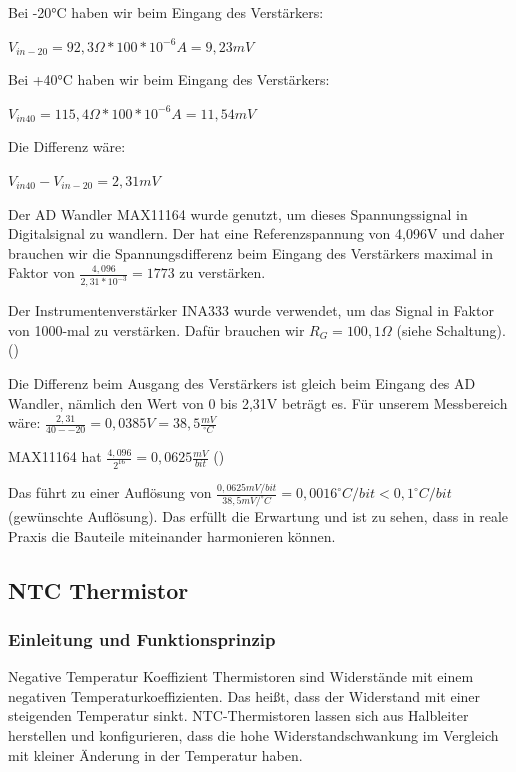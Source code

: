 \documentclass[12pt]{article}
\begin{document}
Bei -20°C haben wir beim Eingang des Verstärkers: 

\begin{center}
  $V_{in-20} = 92,3\Omega * 100 * 10^{-6}A = 9,23mV$ 
\end{center}

Bei +40°C haben wir beim Eingang des Verstärkers: 

\begin{center}
  $V_{in40} = 115,4\Omega * 100 * 10^{-6}A = 11,54mV$ 
\end{center}

Die Differenz wäre:

\begin{center}
 $V_{in40} - V_{in-20} = 2,31mV$
\end{center}

Der AD Wandler MAX11164 wurde genutzt, um dieses Spannungssignal in Digitalsignal zu wandlern. Der hat eine Referenzspannung von 4,096V und daher brauchen wir die Spannungsdifferenz beim Eingang des Verstärkers maximal in Faktor von $\frac{4,096}{2,31*10^{-3}} = 1773$ zu verstärken. 

Der Instrumentenverstärker INA333 wurde verwendet, um das Signal in Faktor von 1000-mal zu verstärken. Dafür brauchen wir $R_G = 100,1\Omega$ (siehe Schaltung). (\cite{TexasInstruments.2020})

Die Differenz beim Ausgang des Verstärkers ist gleich beim Eingang des AD Wandler, nämlich den Wert von 0 bis 2,31V beträgt es. Für unserem Messbereich wäre: $\frac{2,31}{40 - -20} = 0,0385V = 38,5 \frac{mV}{^{\circ} C}$

MAX11164 hat $\frac{4,096}{2^{16}} = 0,0625 \frac{mV}{bit}$ (\cite{MaximIntegratedProducts.2015})

Das führt zu einer Auflösung von $\frac{0,0625mV/bit}{38,5mV/^{\circ} C} = 0,0016 ^{\circ} C/bit < 0,1 ^{\circ} C/bit$ (gewünschte Auflösung). Das erfüllt die Erwartung und ist zu sehen, dass in reale Praxis die Bauteile miteinander harmonieren können.
\subsection{NTC Thermistor}

\subsubsection{Einleitung und Funktionsprinzip}

Negative Temperatur Koeffizient Thermistoren sind Widerstände mit einem negativen Temperaturkoeffizienten. Das heißt, dass der Widerstand mit einer steigenden Temperatur sinkt. NTC-Thermistoren lassen sich aus Halbleiter herstellen und konfigurieren, dass die hohe Widerstandschwankung im Vergleich mit kleiner Änderung in der Temperatur haben. 
\end{document}
